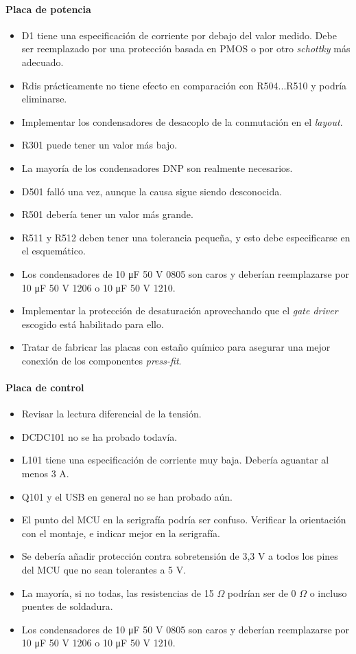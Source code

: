 \paragraph*{Placa de potencia}
\begin{itemize}
	\item D1 tiene una especificación de corriente por debajo del valor medido. Debe ser reemplazado por una protección basada en PMOS o por otro \textit{schottky} más adecuado.
	\item Rdis prácticamente no tiene efecto en comparación con R504...R510 y podría eliminarse.
	\item Implementar los condensadores de desacoplo de la conmutación en el \textit{layout}.
	\item R301 puede tener un valor más bajo.
	\item La mayoría de los condensadores DNP son realmente necesarios.
	\item D501 falló una vez, aunque la causa sigue siendo desconocida.
	\item R501 debería tener un valor más grande.
	\item R511 y R512 deben tener una tolerancia pequeña, y esto debe especificarse en el esquemático.
	\item Los condensadores de 10 \unit{\micro\farad} 50 V 0805 son caros y deberían reemplazarse por 10 \unit{\micro\farad} 50 V 1206 o 10 \unit{\micro\farad} 50 V 1210.
	\item Implementar la protección de desaturación aprovechando que el \textit{gate driver} escogido está habilitado para ello.
	\item Tratar de fabricar las placas con estaño químico para asegurar una mejor conexión de los componentes \textit{press-fit}.	
\end{itemize}

\paragraph*{Placa de control}
\begin{itemize}
	\item Revisar la lectura diferencial de la tensión.
	\item DCDC101 no se ha probado todavía.
	\item L101 tiene una especificación de corriente muy baja. Debería aguantar al menos 3 A.
	\item Q101 y el USB en general no se han probado aún.
	\item El punto del MCU en la serigrafía podría ser confuso. Verificar la orientación con el montaje, e indicar mejor en la serigrafía.
	\item Se debería añadir protección contra sobretensión de 3,3 V a todos los pines del MCU que no sean tolerantes a 5 V.
	\item La mayoría, si no todas, las resistencias de 15 $\Omega$ podrían ser de 0 $\Omega$ o incluso puentes de soldadura.
	\item Los condensadores de 10 \unit{\micro\farad} 50 V 0805 son caros y deberían reemplazarse por 10 \unit{\micro\farad} 50 V 1206 o 10 \unit{\micro\farad} 50 V 1210.
\end{itemize}

